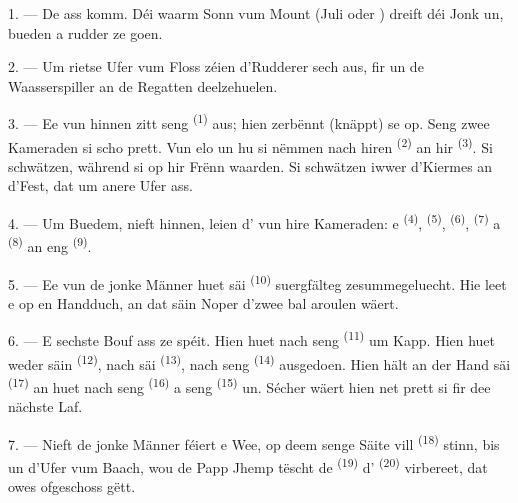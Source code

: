 \VUsaut{2.4mm}

\VUsaut{3.0mm}

1. --- De  ass komm. Déi waarm Sonn vum Mount  (Juli oder
) dreift déi Jonk un, bueden a rudder ze goen.

2. --- Um rietse Ufer vum Floss zéien d'Rudderer sech aus, fir un de Waasserspiller
an de Regatten deelzehuelen.

3. --- Ee vun hinnen zitt seng  \textsuperscript{(1)} aus; hien
zerbënnt (knäppt) se op. Seng zwee Kameraden si scho prett. Vun elo un hu si nëmmen
nach hiren  \textsuperscript{(2)} an hir 
\textsuperscript{(3)}. Si schwätzen, während si op hir Frënn waarden. Si schwätzen
iwwer d'Kiermes an d'Fest, dat um anere Ufer ass.

4. --- Um Buedem, nieft hinnen, leien d' vun hire Kameraden: e
  \textsuperscript{(4)}, 
\textsuperscript{(5)},  \textsuperscript{(6)}, 
\textsuperscript{(7)} a  \textsuperscript{(8)} an eng
 \textsuperscript{(9)}.

5. --- Ee vun de jonke Männer huet säi  \textsuperscript{(10)}
suergfälteg zesummegeluecht. Hie leet e op en Handduch, an dat säin Noper d'zwee
 bal aroulen wäert.

6. --- E sechste Bouf ass ze spéit. Hien huet nach seng 
\textsuperscript{(11)} um Kapp. Hien huet weder säin 
\textsuperscript{(12)}, nach säi  \textsuperscript{(13)}, nach seng
 \textsuperscript{(14)} ausgedoen. Hien hält an der Hand säi
 \textsuperscript{(17)} an huet nach seng 
\textsuperscript{(16)} a seng  \textsuperscript{(15)} un. Sécher
wäert hien net prett si fir dee nächste Laf.

7. --- Nieft de jonke Männer féiert e Wee, op deem senge Säite vill
 \textsuperscript{(18)} stinn, bis un d'Ufer vum Baach, wou de
Papp Jhemp tëscht de  \textsuperscript{(19)} d'
\textsuperscript{(20)} virbereet, dat owes ofgeschoss gëtt.

\VUsaut{4.4mm}
\VUsaut{3.4mm}

